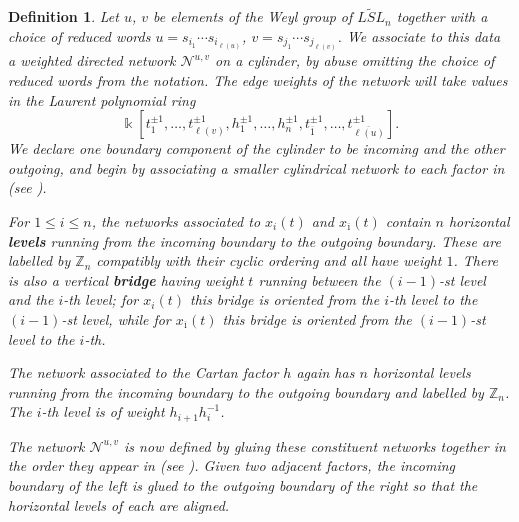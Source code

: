 \documentclass[12pt]{amsart}
\newcommand{\newword}[1]{\textbf{\emph{#1}}}
\newcommand{\ZZ}{\mathbb{Z}}
\newcommand{\kk}{\Bbbk}
\newcommand{\cN}{\mathcal{N}} %
\newcommand{\ol}[1]{\overline{#1}}
\newtheorem{definition}[theorem]{Definition}
\theoremstyle{remark}
\numberwithin{equation}{section}
\numberwithin{figure}{section}
\begin{document}
\begin{definition}
  \label{def:network}
  Let $u$, $v$ be elements of the Weyl group of $\widetilde{LSL}_n$ together with a choice of reduced words $u=s_{i_1}\cdots s_{i_{\ell(u)}}$, $v=s_{j_1}\cdots s_{j_{\ell(v)}}$.
  We associate to this data a weighted directed network $\cN^{u,v}$ on a cylinder, by abuse omitting the choice of reduced words from the notation.
  The edge weights of the network will take values in the Laurent polynomial ring
  \[
    \kk[t_{1}^{\pm1},\dotsc,t_{\ell(v)}^{\pm 1},h_1^{\pm 1},\dotsc,h_{n}^{\pm 1},t_{\ol{1}}^{\pm 1},\dotsc,t_{\ol{\ell(u)}}^{\pm 1}].
  \] 
  We declare one boundary component of the cylinder to be incoming and the other outgoing, and begin by associating a smaller cylindrical network to each factor in  (see ).
  
  For $1 \leq i \leq n$, the networks associated to $x_i(t)$ and $x_{\ol{\imath}}(t)$ contain $n$ horizontal \newword{levels} running from the incoming boundary to the outgoing boundary.
  These are labelled by $\ZZ_n$ compatibly with their cyclic ordering and all have weight $1$.
  There is also a vertical \newword{bridge} having weight $t$ running between the $(i-1)$-st level and the $i$-th level; for $x_i(t)$ this bridge is oriented from the $i$-th level to the $(i-1)$-st level, while for $x_{\ol{\imath}}(t)$ this bridge is oriented from the $(i-1)$-st level to the $i$-th.
  
  The network associated to the Cartan factor $h$ again has $n$ horizontal levels running from the incoming boundary to the outgoing boundary and labelled by $\ZZ_n$.
  The $i$-th level is of weight $h_{i+1}h_{i}^{-1}$.
  
  The network $\cN^{u,v}$ is now defined by gluing these constituent networks together in the order they appear in  (see ).
  Given two adjacent factors, the incoming boundary of the left is glued to the outgoing boundary of the right so that the horizontal levels of each are aligned.
\end{definition}
\end{document}
